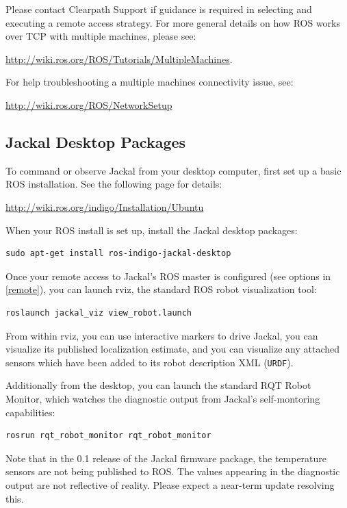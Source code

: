 \documentclass[]{clearpath-manual}
\begin{document}
Please contact Clearpath Support if guidance is required in selecting and executing a
remote access strategy. For more general details on how ROS works over TCP with
multiple machines, please see:

\url{http://wiki.ros.org/ROS/Tutorials/MultipleMachines}.

For help troubleshooting a multiple machines connectivity issue, see:

\url{http://wiki.ros.org/ROS/NetworkSetup}

\subsection{Jackal Desktop Packages}

To command or observe Jackal from your desktop computer, first set up a basic
ROS installation. See the following page for details:

\url{http://wiki.ros.org/indigo/Installation/Ubuntu}

When your ROS install is set up, install the Jackal desktop packages:

\begin{lstlisting}
sudo apt-get install ros-indigo-jackal-desktop
\end{lstlisting}

Once your remote access to Jackal's ROS master is configured (see options in \autoref{remote}),
you can launch rviz, the standard ROS robot visualization tool:

\begin{lstlisting}
roslaunch jackal_viz view_robot.launch
\end{lstlisting}

From within rviz, you can use interactive markers to drive Jackal, you can visualize its
published localization estimate, and you can visualize any attached sensors which have been
added to its robot description XML (\lstinline{URDF}).

Additionally from the desktop, you can launch the standard RQT Robot Monitor, which
watches the diagnostic output from Jackal's self-montoring capabilities:

\begin{lstlisting}
rosrun rqt_robot_monitor rqt_robot_monitor
\end{lstlisting}


\begin{warning}
Note that in the 0.1 release of the Jackal firmware package, the temperature sensors are not
being published to ROS. The values appearing in the diagnostic output are not reflective of
reality. Please expect a near-term update resolving this.
\end{warning}
\end{document}
